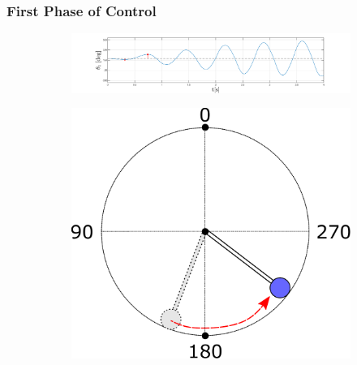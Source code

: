 \documentclass[]{beamer}
\begin{document}
\begin{frame}
	\frametitle{First Phase of Control}
	\begin{figure}[H]
		\centering
		\begin{subfigure}
			\centering
			\includegraphics[scale=0.25]{images/swings2/swing3.pdf}  
		\end{subfigure}
		\begin{subfigure}
			\centering
			\includegraphics[scale=0.25]{images/swing2.pdf}  
		\end{subfigure}
	\end{figure}
\end{frame}
\end{document}
